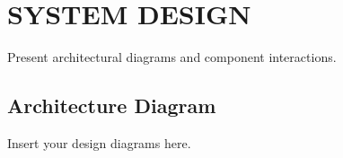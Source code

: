 \chapter{SYSTEM DESIGN}
\label{ch:design}

Present architectural diagrams and component interactions.
\section{Architecture Diagram}
Insert your design diagrams here.
